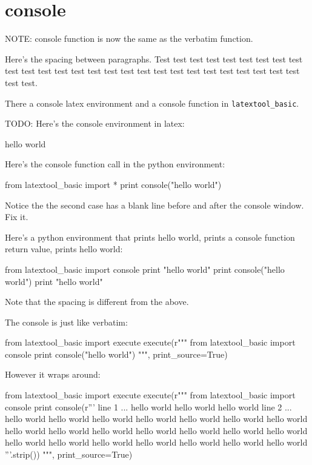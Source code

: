 \section{console}

NOTE: console function is now the same as the verbatim function.

Here's the spacing between paragraphs.
Test 
test test test test test test test test test test test test test test
test test test test test test test test test test test test test test.


There a console latex environment and a console function in 
\verb!latextool_basic!.
 
TODO:
Here's the console environment in latex:
\begin{console}
hello world
\end{console}
Here's the console function call in the python environment:
\begin{python}
from latextool_basic import *
print console("hello world")
\end{python}
Notice the the second case has a blank line before and after the console
window.
Fix it.

Here's a python environment that prints hello world, prints a console
function return value, prints hello world:
\begin{python}
from latextool_basic import console
print "hello world"
print console("hello world")
print "hello world"
\end{python}

Note that the spacing is different from the above.


The console is just like verbatim:
\begin{python}
from latextool_basic import execute
execute(r"""
from latextool_basic import console
print console("hello world")
""", print_source=True)
\end{python}


However it wraps around:
\begin{python}
from latextool_basic import execute
execute(r"""
from latextool_basic import console
print console(r'''
line 1 ... hello world hello world hello world
line 2 ... hello world hello world hello world hello world hello world hello world hello world hello world hello world hello world hello world hello world hello world hello world hello world hello world hello world hello world hello world hello world hello world
'''.strip())
""", print_source=True)
\end{python}

